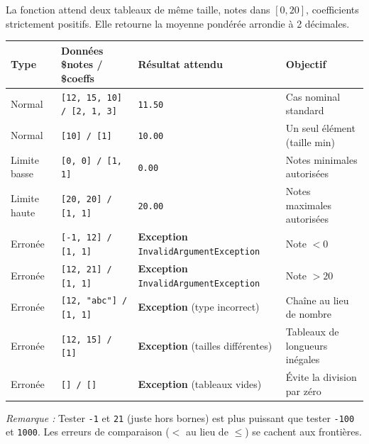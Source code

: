 \documentclass[11pt]{article}
\begin{document}
\begin{exemplebox}
La fonction attend deux tableaux de même taille, notes dans $[0, 20]$, coefficients strictement positifs. Elle retourne la moyenne pondérée arrondie à 2 décimales.

\begin{center}
\begin{tabularx}{\linewidth}{|l|X|X|X|}
\hline
\rowcolor{popblueL}
\textbf{Type} & \textbf{Données \$notes / \$coeffs} & \textbf{Résultat attendu} & \textbf{Objectif} \\
\hline
Normal & \texttt{[12, 15, 10] / [2, 1, 3]} & \texttt{11.50} & Cas nominal standard \\
\hline
Normal & \texttt{[10] / [1]} & \texttt{10.00} & Un seul élément (taille min) \\
\hline
Limite basse & \texttt{[0, 0] / [1, 1]} & \texttt{0.00} & Notes minimales autorisées \\
\hline
Limite haute & \texttt{[20, 20] / [1, 1]} & \texttt{20.00} & Notes maximales autorisées \\
\hline
Erronée & \texttt{[-1, 12] / [1, 1]} & \textbf{Exception} \texttt{InvalidArgumentException} & Note $< 0$ \\
\hline
Erronée & \texttt{[12, 21] / [1, 1]} & \textbf{Exception} \texttt{InvalidArgumentException} & Note $> 20$ \\
\hline
Erronée & \texttt{[12, "abc"] / [1, 1]} & \textbf{Exception} (type incorrect) & Chaîne au lieu de nombre \\
\hline
Erronée & \texttt{[12, 15] / [1]} & \textbf{Exception} (tailles différentes) & Tableaux de longueurs inégales \\
\hline
Erronée & \texttt{[] / []} & \textbf{Exception} (tableaux vides) & Évite la division par zéro \\
\hline
\end{tabularx}
\end{center}
\emph{Remarque :} Tester \texttt{-1} et \texttt{21} (juste hors bornes) est plus puissant que tester \texttt{-100} et \texttt{1000}. Les erreurs de comparaison ($<$ au lieu de $\le$) se cachent aux frontières.
\end{exemplebox}
\end{document}
